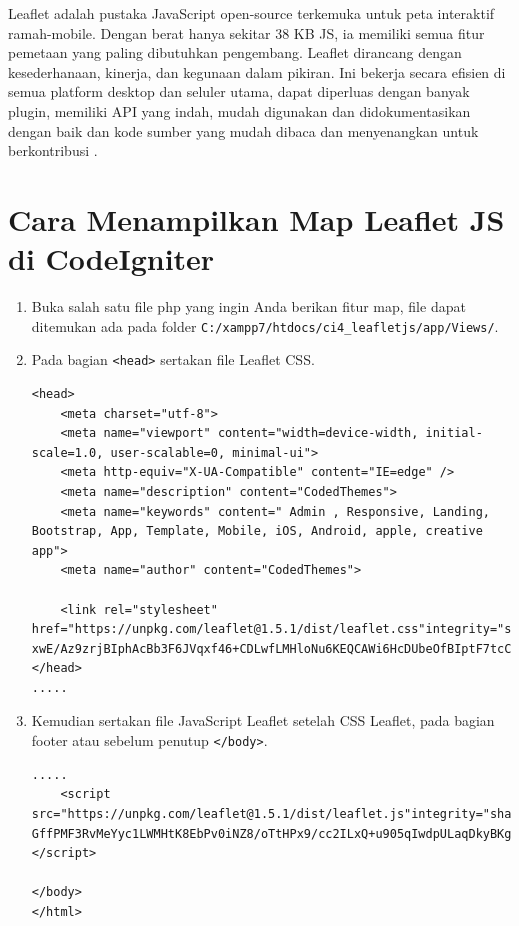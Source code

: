 Leaflet adalah pustaka JavaScript open-source terkemuka untuk peta interaktif ramah-mobile. Dengan berat hanya sekitar 38 KB JS, ia memiliki semua fitur pemetaan yang paling dibutuhkan pengembang. Leaflet dirancang dengan kesederhanaan, kinerja, dan kegunaan dalam pikiran. Ini bekerja secara efisien di semua platform desktop dan seluler utama, dapat diperluas dengan banyak plugin, memiliki API yang indah, mudah digunakan dan didokumentasikan dengan baik dan kode sumber yang mudah dibaca dan menyenangkan untuk berkontribusi \cite{everviewleaflet}.


\section{Cara Menampilkan Map Leaflet JS di CodeIgniter}
\begin{enumerate}
    \item Buka salah satu file php yang ingin Anda berikan fitur map, file dapat ditemukan ada pada folder  \verb|C:/xampp7/htdocs/ci4_leafletjs/app/Views/|.
    \item Pada bagian \verb|<head>| sertakan file Leaflet CSS.
\begin{lstlisting}[caption=File Leaflet CSS]
<head>
    <meta charset="utf-8">
    <meta name="viewport" content="width=device-width, initial-scale=1.0, user-scalable=0, minimal-ui">
    <meta http-equiv="X-UA-Compatible" content="IE=edge" />
    <meta name="description" content="CodedThemes">
    <meta name="keywords" content=" Admin , Responsive, Landing, Bootstrap, App, Template, Mobile, iOS, Android, apple, creative app">
    <meta name="author" content="CodedThemes">
    
    <link rel="stylesheet" href="https://unpkg.com/leaflet@1.5.1/dist/leaflet.css"integrity="sha512-xwE/Az9zrjBIphAcBb3F6JVqxf46+CDLwfLMHloNu6KEQCAWi6HcDUbeOfBIptF7tcCzusKFjFw2yuvEpDL9wQ=="crossorigin=""/>
</head>
.....
\end{lstlisting}

    \item Kemudian sertakan file JavaScript Leaflet setelah CSS Leaflet, pada  bagian footer atau sebelum penutup \verb|</body>|.
\begin{lstlisting}[caption=File JavaScript Leaflet]
.....
    <script src="https://unpkg.com/leaflet@1.5.1/dist/leaflet.js"integrity="sha512-GffPMF3RvMeYyc1LWMHtK8EbPv0iNZ8/oTtHPx9/cc2ILxQ+u905qIwdpULaqDkyBKgOaB57QTMg7ztg8Jm2Og=="crossorigin=""></script>

</body>
</html>
\end{lstlisting}


\end{enumerate}
